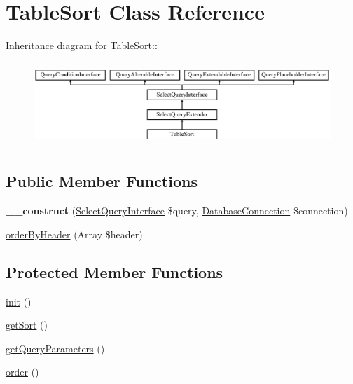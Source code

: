 \hypertarget{classTableSort}{
\section{TableSort Class Reference}
\label{classTableSort}
}
Inheritance diagram for TableSort::\begin{figure}[H]
\begin{center}
\leavevmode
\includegraphics[height=3.21839cm]{classTableSort}
\end{center}
\end{figure}
\subsection*{Public Member Functions}
\begin{DoxyCompactItemize}
\item 
\hypertarget{classTableSort_a3b68497e3ceec4d4fea6d2df8c66ced9}{
{\bfseries \_\-\_\-construct} (\hyperlink{interfaceSelectQueryInterface}{SelectQueryInterface} \$query, \hyperlink{classDatabaseConnection}{DatabaseConnection} \$connection)}
\label{classTableSort_a3b68497e3ceec4d4fea6d2df8c66ced9}

\item 
\hyperlink{classTableSort_a47053e8a5d2ff21846e09ce00e4b21e4}{orderByHeader} (Array \$header)
\end{DoxyCompactItemize}
\subsection*{Protected Member Functions}
\begin{DoxyCompactItemize}
\item 
\hyperlink{classTableSort_ab3165d4f0a0580c997db2dc8577d1a02}{init} ()
\item 
\hyperlink{classTableSort_a600bbe2947b4d9059ebda2c24dfdf223}{getSort} ()
\item 
\hyperlink{classTableSort_ae490f3120363a9bde624de4d94c02862}{getQueryParameters} ()
\item 
\hyperlink{classTableSort_a098cd3fed81ee37ad2159309203ada60}{order} ()
\end{DoxyCompactItemize}

